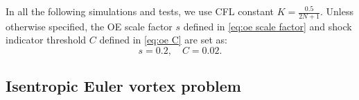 \documentclass[fleqn,11pt]{amsart}
\begin{document}
{%
In all the following simulations and tests, we use CFL constant $K=\frac{0.5}{2N+1}$. Unless otherwise specified, the OE scale factor $s$ defined in \eqref{eq:oe scale factor} and shock indicator threshold $C$ defined in \eqref{eq:oe C} are set as:
\begin{equation}
\label{eq:sC}
    s=0.2, \quad C=0.02.
\end{equation}



\subsection{Isentropic Euler vortex problem}
}
\end{document}
